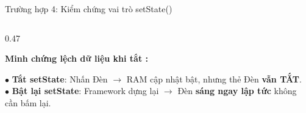 \documentclass[aspectratio=169, 11pt]{beamer}
\newcommand{\code}[1]{\leavevmode{\ttfamily\color{DarkMain}#1}}
\begin{document}
\begin{frame}[fragile]{Trường hợp 4: Kiểm chứng vai trò setState()}
\begin{columns}[T, onlytextwidth]
\begin{column}{0.47\textwidth}
      \vspace{0.16cm}
      \begin{tcolorbox}[colback=CodeBg, colframe=DarkMain, left=6pt, right=6pt, top=4pt, bottom=4pt]
        {\scriptsize\bfseries Minh chứng lệch dữ liệu khi tắt \code{setState()}:}\\[2pt]
        {\fontsize{7.3pt}{9.6pt}\selectfont\raggedright
        $\bullet$ \textbf{Tắt setState}: Nhấn Đèn $\to$ RAM cập nhật bật, nhưng thẻ Đèn \textbf{vẫn TẮT}.\\[1.5pt]
        $\bullet$ \textbf{Bật lại setState}: Framework dựng lại $\to$ Đèn \textbf{sáng ngay lập tức} không cần bấm lại.
        }
      \end{tcolorbox}
    \end{column}
  \end{columns}
\end{frame}

\end{document}
